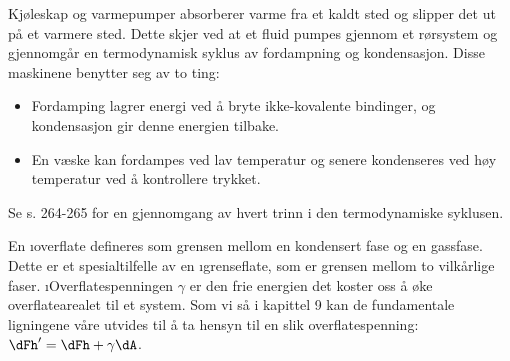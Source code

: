 Kjøleskap og varmepumper absorberer varme fra et kaldt sted og slipper det ut på et varmere sted. Dette skjer ved at et fluid pumpes gjennom et rørsystem og gjennomgår en termodynamisk syklus av fordampning og kondensasjon. Disse maskinene benytter seg av to ting:
\begin{itemize}
	\item Fordamping lagrer energi ved å bryte ikke-kovalente bindinger, og kondensasjon gir denne energien tilbake.
	\item En væske kan fordampes ved lav temperatur og senere kondenseres ved høy temperatur ved å kontrollere trykket.
\end{itemize}
Se s. 264-265 for en gjennomgang av hvert trinn i den termodynamiske syklusen.

En \i{overflate} defineres som grensen mellom en kondensert fase og en gassfase. Dette er et spesialtilfelle av en \i{grenseflate}, som er grensen mellom to vilkårlige faser. \i{Overflatespenning}en $\gamma$ er den frie energien det koster oss å øke overflatearealet til et system. Som vi så i kapittel 9 kan de fundamentale ligningene våre utvides til å ta hensyn til en slik overflatespenning: $\dFh'=\dFh+\gamma\dA$. 

